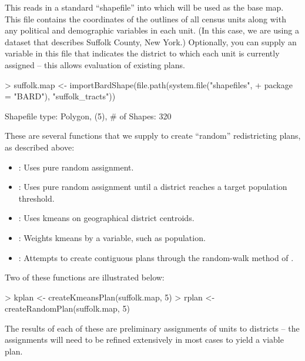 \documentclass[article]{JSSstyle/jss}
\begin{document}
This reads in a standard ``shapefile'' into  which will be used as the base map.
This file contains the coordinates of the outlines of all census units along with any political and demographic variables in each unit. (In this case, we are using a dataset that describes Suffolk County, New York.) Optionally, you can supply an variable in this file that indicates the district to which each unit is currently assigned -- this allows evaluation of existing plans. 

\begin{Schunk}
\begin{Sinput}
> suffolk.map <- importBardShape(file.path(system.file("shapefiles", 
+     package = "BARD"), "suffolk_tracts"))
\end{Sinput}
\begin{Soutput}
Shapefile type: Polygon, (5), # of Shapes: 320
\end{Soutput}
\end{Schunk}

These are several functions that we supply to create ``random'' redistricting plans, as described above:
\begin{itemize}
	\item {}: Uses pure random assignment.
	\item {}: Uses pure random assignment until a district reaches a target population threshold.
	\item {}: Uses kmeans on geographical district centroids.
	\item {}: Weights kmeans by a variable, such as population.
	\item {}: Attempts to create contiguous plans through the random-walk method of \citet{CirDarOro00}.
\end{itemize}

Two of these functions are illustrated below:
\begin{Schunk}
\begin{Sinput}
> kplan <- createKmeansPlan(suffolk.map, 5)
> rplan <- createRandomPlan(suffolk.map, 5)
\end{Sinput}
\end{Schunk}

The results of each of these are preliminary assignments of units to districts -- the assignments will need to be refined extensively in most cases to yield a viable plan. 
\end{document}
